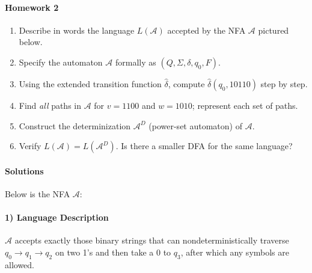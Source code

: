 \documentclass{article}
\theoremstyle{theorem}
\theoremstyle{definition}
\theoremstyle{remark}
\begin{document}
\paragraph*{Homework 2}
\begin{enumerate}
  \item Describe in words the language \(L(\mathcal{A})\) accepted by the NFA \(\mathcal{A}\) pictured below.
  \item Specify the automaton \(\mathcal{A}\) formally as \((Q,\Sigma,\delta,q_0,F)\).
  \item Using the extended transition function \(\hat{\delta}\), compute \(\hat{\delta}(q_0,10110)\) step by step.
  \item Find \emph{all} paths in \(\mathcal{A}\) for \(v=1100\) and \(w=1010\); represent each set of paths.
  \item Construct the determinization \(\mathcal{A}^D\) (power-set automaton) of \(\mathcal{A}\).
  \item Verify \(L(\mathcal{A}) = L(\mathcal{A}^D)\). Is there a smaller DFA for the same language?
\end{enumerate}

\newpage

\paragraph*{Solutions}
Below is the NFA \(\mathcal{A}\):

\begin{center}
\end{center}

\paragraph{1) Language Description}  
\(\mathcal{A}\) accepts exactly those binary strings that can nondeterministically traverse  
\(q_0\to q_1\to q_2\) on two 1’s and then take a 0 to \(q_3\), after which any symbols are allowed.
\end{document}
